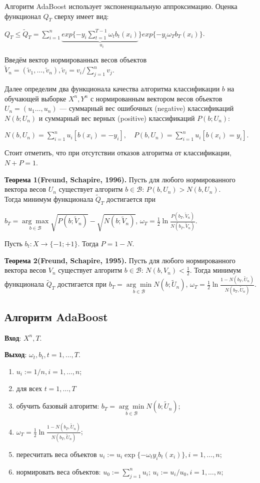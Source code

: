 \documentclass[specialist, 12pt, href]{article}
\begin{document}
\newpage
Алгоритм AdaBoost использует экспоненциальную аппроксимацию. Оценка функционал $Q_T$ сверху имеет вид:
  
  $ Q_T \leq \tilde Q_T = \sum \limits _{i = 1} ^ n \underset{u_i}{\underbrace{exp\{-y_i\sum\limits_{t=1}^{T-1}\omega_tb_t(x_i)}\}} exp\{-y_i\omega_Tb_T(x_i)\}$.

Введём вектор нормированных весов объектов $\tilde  V_n = (\tilde v_1,\dots,\tilde v_n), \tilde  v_i =  v_i / \sum \limits _{j = 1}^n v_j$.

Далее определим два функционала качества алгоритма классификации $b$ на обучающей выборке $X^n, Y^n$
с нормированным вектором весов объектов $U_n = (u_1 \dots,u_n)$ --- суммарный вес ошибочных (negative)  классификаций $N(b;U_n)$ и суммарный вес верных (positive) классификаций $P(b; U_n)$:

$N(b, U_n) = \sum\limits_{i = 1}^n  u_i[b(x_i) = -y_i], \quad P(b, U_n) = \sum\limits_{i = 1}^n  u_i[b(x_i) = y_i].$ 

Стоит отметить, что при отсутствии отказов алгоритма от классификации, $N + P = 1$.

\textbf{Теорема 1(Freund, Schapire, 1996).} Пусть для любого нормированного вектора весов $ U_n$ существует алгоритм $b \in \mathcal{B}$: $P(b, U_n) > N(b, U_n)$. \\
 Тогда минимум функционала $\tilde Q_T$ достигается при 
 
 $b_T =  \underset{b  \in \mathcal{B}}{\arg\max} \sqrt{P(b;\tilde V_n)} - \sqrt{N(b;\tilde V_n)}$, $\omega_T = \frac{1}{2} \ln\frac{P(b_T,\tilde V_n)}{N(b_T,\tilde V_n)}$.

Пусть $b_t: X \rightarrow \{-1;+1\}$. Тогда $P = 1 - N$.

\textbf{Теорема 2(Freund, Schapire, 1995).} Пусть для любого нормированного вектора весов $ V_n$ существует алгоритм $b \in \mathcal{B}$: $N(b, V_n) < \frac{1}{2}$.
 Тогда минимум функционала $\tilde Q_T$ достигается при  
 $b_T =  \underset{b  \in \mathcal{B}}{\arg\min} N(b;\tilde U_n)$, $\omega_T = \frac{1}{2} \ln\frac{1 - N(b_T,\tilde U_n)}{N(b_T,\tilde U_n)}$.

\subsection*{Алгоритм AdaBoost}

{\bf {Вход}}: $X^n, T$.

{\bf {Выход}}: $\omega_t, b_t, t = 1,\dots,T$.
\begin{enumerate}
    \item $u_i := 1/n, i = 1,\dots,n$;
    \item для всех $t = 1,\dots,T$
    \item обучить базовый алгоритм: $b_T =  \underset{b  \in \mathcal{B}}{\arg\min} N(b;\tilde U_n)$; 
    \item $\omega_T = \frac{1}{2} \ln\frac{1 - N(b_T,\tilde U_n)}{N(b_T,\tilde U_n)}$;
    \item пересчитать веса объектов $u_i := u_i \exp\{-\omega_t y_i b_t(x_i)\}, i = 1,\dots,n$;
    \item нормировать веса объектов: $u_0 := \sum\limits_{j=1}^n u_i$; $u_i := u_i/u_0, i = 1,\dots,n$;
\end{enumerate}
\end{document}
